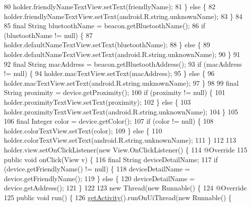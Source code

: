 \begin{DoxyCode}
{{80             holder.friendlyNameTextView.setText(friendlyName);
81         \} \textcolor{keywordflow}{else} \{
82             holder.friendlyNameTextView.setText(android.R.string.unknownName);
83         \}
84 
85         \textcolor{keyword}{final} String bluetoothName = beacon.getBluetoothName();
86         \textcolor{keywordflow}{if} (bluetoothName != null) \{
87             holder.defaultNameTextView.setText(bluetoothName);
88         \} \textcolor{keywordflow}{else} \{
89             holder.defaultNameTextView.setText(android.R.string.unknownName);
90         \}
91 
92         \textcolor{keyword}{final} String macAddress = beacon.getBluetoothAddress();
93         \textcolor{keywordflow}{if} (macAddress != null) \{
94             holder.macTextView.setText(macAddress);
95         \} \textcolor{keywordflow}{else} \{
96             holder.macTextView.setText(android.R.string.unknownName);
97         \}
98 
99         \textcolor{keyword}{final} String proximity = device.getProximity();
100         \textcolor{keywordflow}{if} (proximity != null) \{
101             holder.proximityTextView.setText(proximity);
102         \} \textcolor{keywordflow}{else} \{
103             holder.proximityTextView.setText(android.R.string.unknownName);
104         \}
105 
106         \textcolor{keyword}{final} Integer color = device.getColor();
107         \textcolor{keywordflow}{if} (color != null) \{
108             holder.colorTextView.setText(color);
109         \} \textcolor{keywordflow}{else} \{
110             holder.colorTextView.setText(android.R.string.unknownName);
111         \}
112 
113         holder.view.setOnClickListener(\textcolor{keyword}{new} View.OnClickListener() \{
114             @Override
115             \textcolor{keyword}{public} \textcolor{keywordtype}{void} onClick(View v) \{
116                 \textcolor{keyword}{final} String deviceDetailName;
117                 \textcolor{keywordflow}{if} (device.getFriendlyName() != null) \{
118                     deviceDetailName = device.getFriendlyName();
119                 \} \textcolor{keywordflow}{else} \{
120                     deviceDetailName = device.getAddress();
121                 \}
122 
123                 \textcolor{keyword}{new} Thread(\textcolor{keyword}{new} Runnable() \{
124                     @Override
125                     \textcolor{keyword}{public} \textcolor{keywordtype}{void} run() \{
126                         \hyperlink{classit_1_1unibo_1_1torsello_1_1bluetoothpositioning_1_1adapter_1_1DeviceCardViewAdapter_a0ff32c6bf5d84b68021bf586d64cacaf_a0ff32c6bf5d84b68021bf586d64cacaf}{getActivity}().runOnUiThread(\textcolor{keyword}{new} Runnable() \{
}}
\end{DoxyCode}
